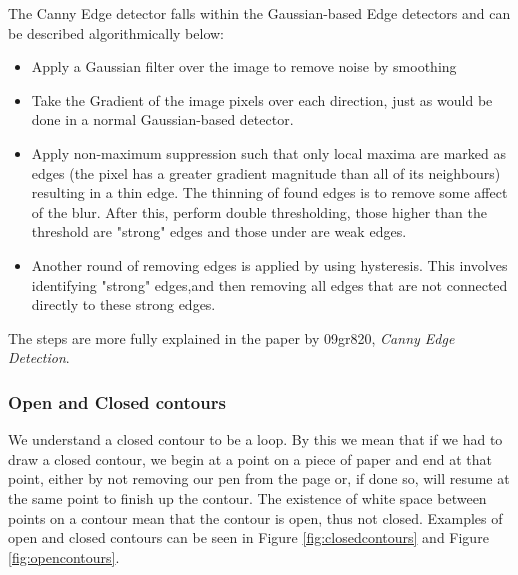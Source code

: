 \documentclass[11pt]{article}
\begin{document}
The Canny Edge detector falls within the Gaussian-based Edge detectors and
can be described algorithmically below:
\begin{itemize}
	\item Apply a Gaussian filter over the image to remove noise by smoothing
	\item Take the Gradient of the image pixels over each direction, just as
		  would be done in a normal Gaussian-based detector.
	\item Apply non-maximum suppression 
		  such that only local maxima are marked as edges (the pixel 
		  has a greater gradient magnitude than all
		  of its neighbours) resulting in a thin edge. The thinning of found
		  edges is to remove some affect of the blur. After this, perform
		  double thresholding, those higher than the threshold are "strong" edges
		  and those under are weak edges.
	\item Another round of removing edges is applied by using hysteresis.
		  This involves identifying "strong" edges,and then removing 
		  all edges that are not connected directly to these strong edges.
\end{itemize}

The steps are more fully explained in the paper by 09gr820, 
\textit{Canny Edge Detection}\cite{09gr820}.

\subsubsection{Open and Closed contours}
We understand a closed contour to be a loop. By this we mean that if we had
to draw a closed contour, we begin at a point on a piece of paper and end at that
point, either by not removing our pen from the page or, if done so, will resume
at the same point to finish up the contour. The existence of white space between
points on a contour mean that the contour is open, thus not closed. Examples
of open and closed contours can be seen in Figure \ref{fig:closedcontours} and 
Figure \ref{fig:opencontours}.
\\
\end{document}
